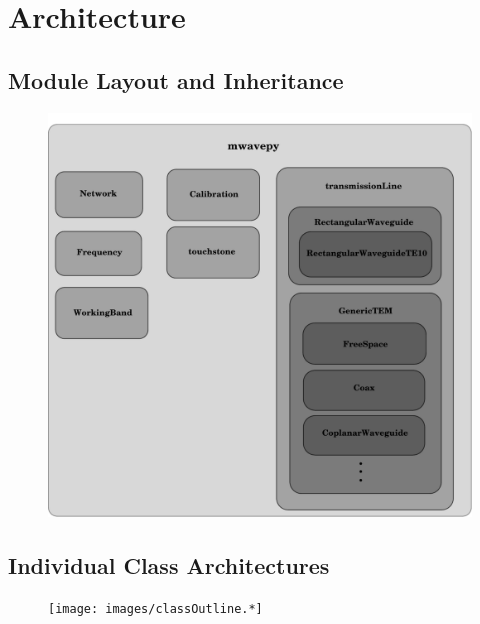 \documentclass[letterpaper,10pt,english]{sphinxmanual}
\begin{document}
\chapter{Architecture}
\label{architecture::doc}\label{architecture:architecture}\label{architecture:id1}

\section{Module Layout and Inheritance}
\label{architecture:module-layout-and-inheritance}\begin{figure}[htbp]
\centering

\includegraphics{classInheretanceOutline.pdf}
\end{figure}


\section{Individual Class Architectures}
\label{architecture:individual-class-architectures}\begin{figure}[htbp]
\centering

\texttt{[image: images/classOutline.*]}
\end{figure}
\end{document}
